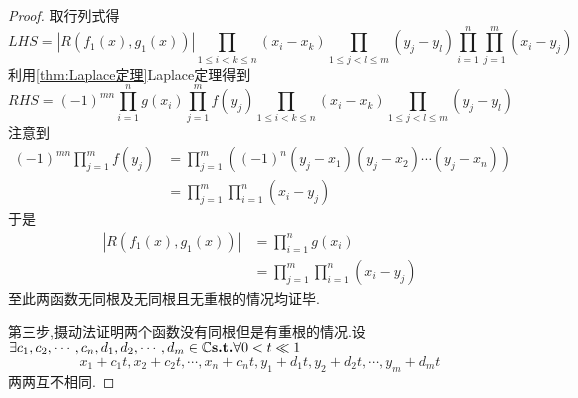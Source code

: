 {\begin{proof}
        取行列式得
        \[
            LHS = \left|
            R \left(
            f_1\left(x\right),g_1\left(x\right)
            \right)
            \right|\prod_{1\leqslant i<k\leqslant n}\left(
            x_i-x_k
            \right)\prod_{1\leqslant j<l\leqslant m}\left(
            y_j-y_l
            \right)
            \prod_{i=1}^{n}\prod_{j=1}^{m}\left(
            x_i-y_j
            \right)
        \]
        利用\cref{thm:Laplace定理}Laplace定理得到
        \[
            RHS=\left(-1\right)^{mn}\prod_{i=1}^{n}
            g\left(x_i\right)\prod_{j=1}^{m}f\left(y_j\right)\prod_{1\leqslant i<k\leqslant n}\left(
            x_i-x_k
            \right)\prod_{1\leqslant j<l\leqslant m}\left(
            y_j-y_l
            \right)
        \]
        注意到
        \begin{align*}
            \left(-1\right)^{mn}\prod_{j=1}^{m}f\left(y_j\right) & =\prod_{j=1}^{m}\left(
            \left(-1\right)^n\left(y_j-x_1\right)\left(y_j-x_2\right)\cdots\left(y_j-x_n\right)
            \right)                                                                                      \\
                                                                 & =\prod_{j=1}^{m}\prod_{i=1}^{n}\left(
            x_i-y_j
            \right)
        \end{align*}
        于是
        \begin{align*}
            \left|
            R\left(f_1\left(x\right),g_1\left(x\right)\right)
            \right| & =\prod_{i=1}^{n}g\left(x_i\right) \\
                    & =
            \prod_{j=1}^{m}\prod_{i=1}^{n}\left(
            x_i-y_j
            \right)
        \end{align*}至此两函数无同根及无同根且无重根的情况均证毕.

        第三步,摄动法证明两个函数没有同根但是有重根的情况.设$\exists c_1,c_2,\cdots,c_n,d_1,d_2,\cdots,d_m\in\mathbb{C} \textup{\bfseries{s.t.}}\forall 0<t\ll 1$\[x_1+c_1t,x_2+c_2t,\cdots,x_n+c_nt,y_1+d_1t,y_2+d_2t,\cdots,y_m+d_mt\]两两互不相同.


\end{proof}}
